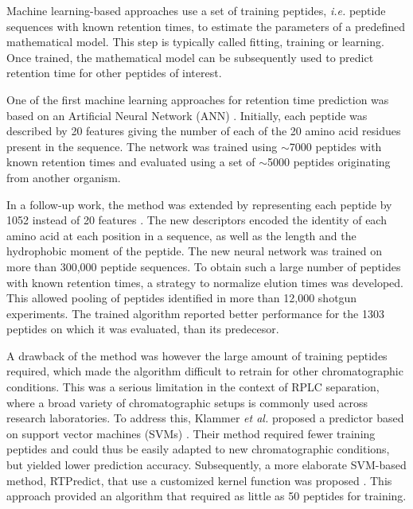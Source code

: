 \documentclass[a4paper]{article}
\begin{document}
Machine learning-based approaches use a set of training peptides, {\em
  i.e.} peptide sequences with known retention times, to estimate the
parameters of a predefined mathematical model. This step is typically
called fitting, training or learning. Once trained, the mathematical
model can be subsequently used to predict retention time for other
peptides of interest.


One of the first machine learning approaches for retention time
prediction was based on an Artificial Neural Network
(ANN) \cite{petritis2003}. Initially, each peptide was described by 20
features giving the number of each of the 20 amino acid residues
present in the sequence. The network was trained using $\sim$7000
peptides with known retention times and evaluated using a set of
$\sim$5000 peptides originating from another organism. 

In a follow-up work, the method was extended by representing each
peptide by 1052 instead of 20 features
\cite{petritis2006improved}. The new descriptors encoded the identity
of each amino acid at each position in a sequence, as well as the
length and the hydrophobic moment of the peptide. The new neural
network was trained on more than 300,000 peptide sequences. To obtain
such a large number of peptides with known retention times, a strategy
to normalize elution times was developed. This allowed pooling of
peptides identified in more than 12,000 shotgun experiments. The
trained algorithm reported better performance for the 1303 peptides
on which it was evaluated, than its predecesor.


A drawback of the method was however the large amount of training
peptides required, which made the algorithm difficult to retrain for
other chromatographic conditions. This was a serious limitation in the
context of RPLC separation, where a broad variety of chromatographic
setups is commonly used across research laboratories. To address this,
Klammer {\em et al.} proposed a predictor based on support vector
machines (SVMs) \cite{klammer2007improving}. Their method required
fewer training peptides and could thus be easily adapted to new
chromatographic conditions, but yielded lower prediction accuracy.
Subsequently, a more elaborate SVM-based method, {\sc RTPredict}, that
 use a customized kernel function was proposed \cite{rtpredict,
rtpredictImproved}. This approach provided an algorithm that required
as little as 50 peptides for training.

\end{document}

